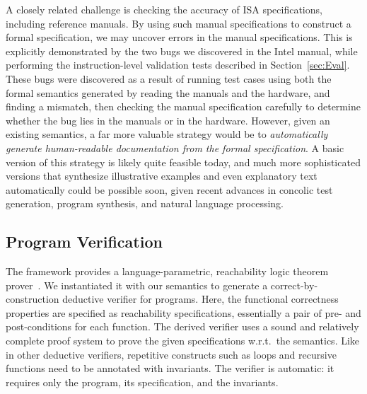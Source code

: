 A closely related challenge is checking the accuracy of ISA specifications, including reference manuals.
%
By using such manual specifications to construct a formal specification, we may uncover errors in the manual specifications.
%
This is explicitly demonstrated by the two bugs we discovered in the Intel \ISA manual, while performing the instruction-level validation tests described in Section~\ref{sec:Eval}.
%
These bugs were discovered as a result of running test cases using both the formal semantics generated by reading the manuals and the hardware, and finding a mismatch, then checking the manual specification  carefully to determine whether the bug lies in the manuals or in the hardware.
%
However, given an existing semantics, a far more valuable strategy would be to \emph{automatically generate human-readable documentation from the formal specification}.
%
A basic version of this strategy is likely quite feasible today, and much more sophisticated versions that synthesize illustrative examples and even explanatory text automatically could be possible soon, given recent advances in concolic test generation, program synthesis, and natural language processing.

%

\subsection{Program Verification}
\label{sec:Appl:Verification}



The \K framework provides a language-parametric, reachability logic theorem prover~\cite{Stefanescu:2016,Rosu:2012}.  We instantiated it with our semantics to generate a correct-by-construction deductive verifier for \ISA programs.
Here, the functional correctness properties are specified as reachability specifications, essentially a pair of pre- and post-conditions for each function.
The derived \ISA verifier uses a sound and relatively complete proof system to prove the given specifications w.r.t.~the \ISA semantics.
Like in other deductive verifiers, repetitive constructs such as loops and recursive functions need to be annotated with invariants.
The verifier is automatic: it requires only the program, its specification, and the invariants.

